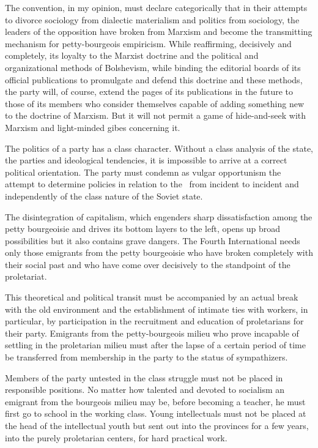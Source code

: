The convention, in my opinion, must declare categorically that in their attempts to divorce sociology from dialectic materialism and politics from sociology, the leaders of the opposition have broken from Marxism and become the transmitting mechanism for petty-bourgeois empiricism. While reaffirming, decisively and completely, its loyalty to the Marxist doctrine and the political and organizational methods of Bolshevism, while binding the editorial boards of its official publications to promulgate and defend this doctrine and these methods, the party will, of course, extend the pages of its publications in the future to those of its members who consider themselves capable of adding something new to the doctrine of Marxism. But it will not permit a game of hide-and-seek with Marxism and light-minded gibes concerning it.

The politics of a party has a class character. Without a class analysis of the state, the parties and ideological tendencies, it is impossible to arrive at a correct political orientation. The party must condemn as vulgar opportunism the attempt to determine policies in relation to the \USSR\ from incident to incident and independently of the class nature of the Soviet state.

The disintegration of capitalism, which engenders sharp dissatisfaction among the petty bourgeoisie and drives its bottom layers to the left, opens up broad possibilities but it also contains grave dangers. The Fourth International needs only those emigrants from the petty bourgeoisie who have broken completely with their social past and who have come over decisively to the standpoint of the proletariat.

This theoretical and political transit must be accompanied by an actual break with the old environment and the establishment of intimate ties with workers, in particular, by participation in the recruitment and education of proletarians for their party. Emigrants from the petty-bourgeois milieu who prove incapable of settling in the proletarian milieu must after the lapse of a certain period of time be transferred from membership in the party to the status of sympathizers.

Members of the party untested in the class struggle must not be placed in responsible positions. No matter how talented and devoted to socialism an emigrant from the bourgeois milieu may be, before becoming a teacher, he must first go to school in the working class. Young intellectuals must not be placed at the head of the intellectual youth but sent out into the provinces for a few years, into the purely proletarian centers, for hard practical work.


